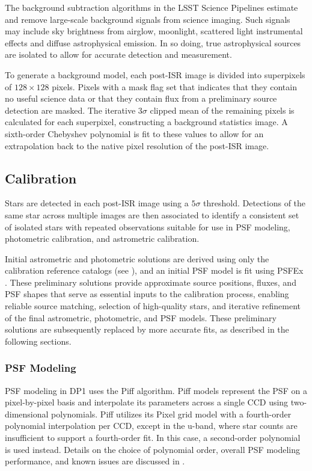 The background subtraction algorithms in the \gls{LSST Science Pipelines} estimate and remove large-scale background signals from science imaging.
Such signals may include sky brightness from airglow, moonlight, scattered light instrumental effects and diffuse astrophysical emission.
In so doing, true astrophysical sources are isolated to allow for accurate detection and measurement.

To generate a \gls{background} model, each post-ISR image is divided into superpixels of $128\times128$ pixels.
Pixels with a mask flag set that indicates that they contain no useful science data or that they contain \gls{flux} from a preliminary source detection are masked.
The iterative $3\sigma$ clipped mean of the remaining pixels is calculated for each superpixel, constructing a \gls{background} statistics image.
A sixth-order Chebyshev polynomial is fit to these values to allow for an extrapolation back to the native pixel resolution of the post-\gls{ISR} image.


\subsection{Calibration}
\label{ssec:drp_calibration}
Stars are detected in each post-\gls{ISR} image using a $5\sigma$ threshold.
Detections of the same star across multiple images are then associated to identify a consistent set of isolated stars with repeated observations suitable for use in PSF modeling, photometric \gls{calibration}, and astrometric \gls{calibration}.

Initial astrometric and photometric solutions are derived using only the calibration reference catalogs (see ), and an initial \gls{PSF} model is fit using PSFEx \citep{2011ASPC..442..435B}.
These preliminary solutions provide approximate source positions, fluxes, and \gls{PSF} shapes that serve as essential inputs to the \gls{calibration} process, enabling reliable source matching, selection of high-quality stars, and iterative refinement of the final astrometric, photometric, and \gls{PSF} models.
These preliminary solutions are subsequently replaced by more accurate fits, as described in the following sections.

\subsubsection{PSF Modeling}
\label{ssec:psf_modelling}
\gls{PSF} modeling in DP1 uses the Piff \citep{DES:2020vau} algorithm.
Piff models represent the \gls{PSF} on a pixel-by-pixel basis and interpolate its parameters across a single CCD using two-dimensional polynomials.
Piff utilizes its Pixel grid model with a fourth-order polynomial interpolation per \gls{CCD}, except in the u-band, where star counts are insufficient to support a fourth-order fit.
In this case, a second-order polynomial is used instead.
Details on the choice of polynomial order, overall \gls{PSF} modeling performance, and known issues are discussed in .

